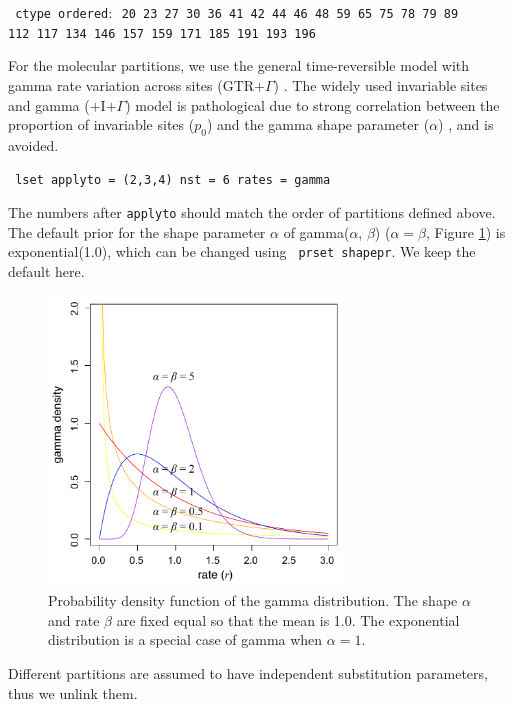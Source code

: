 \documentclass[12pt]{article}
\begin{document}
\medskip
{\tt \color{red} \noindent
ctype ordered$\colon$ 20 23 27 30 36 41 42 44 46 48 59 65 75 78 79 89 \\
 112 117 134 146 157 159 171 185 191 193 196
}
\medskip

For the molecular partitions, we use the general time-reversible model with gamma rate variation across sites (GTR$+\Gamma$) \citep{Yang:1994vo,Yang:1994wd}.
The widely used invariable sites and gamma ($+$I$+\Gamma$) model is pathological due to strong correlation between the proportion of invariable sites ($p_0$) and the gamma shape parameter ($\alpha$) \citep[e.g.,][]{Zhang:2012ke}, and is avoided.

\medskip
{\tt \color{red} \noindent
lset applyto = (2,3,4) nst = 6 rates = gamma
}
\medskip

The numbers after {\tt applyto} should match the order of partitions defined above.
The default prior for the shape parameter $\alpha$ of gamma($\alpha$, $\beta$) ($\alpha = \beta$, Figure \ref{fig_gamma}) is exponential(1.0), which can be changed using {\tt \color{red} prset shapepr}. We keep the default here.

\begin{figure}[h]
\includegraphics[width=0.7\textwidth]{figures/gamma.pdf}
\caption{Probability density function of the gamma distribution. The shape $\alpha$ and rate $\beta$ are fixed equal so that the mean is 1.0.
The exponential distribution is a special case of gamma when $\alpha = 1$.}
\label{fig_gamma}
\end{figure}

Different partitions are assumed to have independent substitution parameters, thus we unlink them. 
\end{document}
